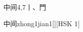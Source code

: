\begin{entry}{中间}{4,7}{⼁、⾨}
  \begin{phonetics}{中间}{zhong1jian1}[][HSK 1]
  \end{phonetics}
\end{entry}

